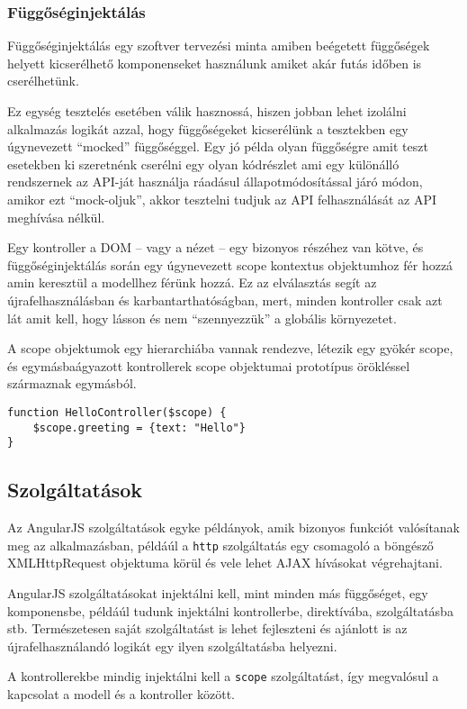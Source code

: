 \subsubsection{Függőséginjektálás}

Függőséginjektálás egy szoftver tervezési minta amiben beégetett függőségek helyett kicserélhető komponenseket használunk amiket akár futás időben is cserélhetünk. 

Ez egység tesztelés esetében válik hasznossá, hiszen jobban lehet izolálni alkalmazás logikát azzal, hogy függőségeket kicserélünk a tesztekben egy úgynevezett ``mocked'' függőséggel. Egy jó példa olyan függőségre amit teszt esetekben ki szeretnénk cserélni egy olyan kódrészlet ami egy különálló rendszernek az API-ját használja ráadásul állapotmódosítással járó módon, amikor ezt ``mock-oljuk'', akkor tesztelni tudjuk az API felhasználását az API meghívása nélkül.

Egy kontroller a DOM -- vagy a nézet -- egy bizonyos részéhez van kötve, és függőséginjektálás során egy úgynevezett scope kontextus objektumhoz fér hozzá amin keresztül a modellhez férünk hozzá. Ez az elválasztás segít az újrafelhasználásban és karbantarthatóságban, mert, minden kontroller csak azt lát amit kell, hogy lásson és nem ``szennyezzük'' a globális környezetet. 

A scope objektumok egy hierarchiába vannak rendezve, létezik egy gyökér scope, és egymásbaágyazott kontrollerek scope objektumai prototípus örökléssel származnak egymásból.  
 
\begin{lstlisting}
function HelloController($scope) {
    $scope.greeting = {text: "Hello"}
}
\end{lstlisting}

\subsection{Szolgáltatások}

Az AngularJS szolgáltatások egyke példányok, amik bizonyos funkciót valósítanak meg az alkalmazásban, példáúl a \lstinline{http} szolgáltatás egy csomagoló a böngésző XMLHttpRequest objektuma körül és vele lehet AJAX hívásokat végrehajtani. 

AngularJS szolgáltatásokat injektálni kell, mint minden más függőséget, egy komponensbe, példáúl tudunk injektálni kontrollerbe, direktívába, szolgáltatásba stb. Természetesen saját szolgáltatást is lehet fejleszteni és ajánlott is az újrafelhasználandó logikát egy ilyen szolgáltatásba helyezni.

A kontrollerekbe mindig injektálni kell a \lstinline{scope} szolgáltatást, így megvalósul a kapcsolat a modell és a kontroller között.

